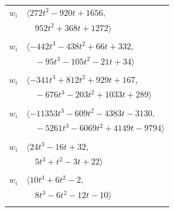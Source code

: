 \documentclass[11pt]{article}
\begin{document}
\begin{longtable}{@{}ll@{}}
$w_i$ & $\langle 272t^{2}-920t+1656,$\\
 & $\quad 952t^{2}+368t+1272\rangle$\\
\addlinespace[2pt]
\multicolumn{2}{@{}p{0.97\textwidth}@{}}{$i=16$, $D_i=16$, $\rho_{ij}$: $0{:}1, \allowbreak 14{:}2, \allowbreak 21{:}2, \allowbreak 34{:}2, \allowbreak 35{:}2, \allowbreak 42{:}2, \allowbreak 44{:}2, \allowbreak 50{:}1$}\\
$w_i$ & $\langle -442t^{3}-438t^{2}+66t+332,$\\
 & $\quad -95t^{3}-105t^{2}-21t+34\rangle$\\
\addlinespace[2pt]
\multicolumn{2}{@{}p{0.97\textwidth}@{}}{$i=17$, $D_i=16$, $\rho_{ij}$: $1{:}2, \allowbreak 3{:}1, \allowbreak 5{:}1, \allowbreak 8{:}2, \allowbreak 14{:}2, \allowbreak 15{:}1, \allowbreak 30{:}1, \allowbreak 33{:}2, \allowbreak 40{:}2, \allowbreak 41{:}2, \allowbreak 45{:}1, \allowbreak 56{:}2$}\\
$w_i$ & $\langle -341t^{3}+812t^{2}+929t+167,$\\
 & $\quad -676t^{3}-203t^{2}+1033t+289\rangle$\\
\addlinespace[2pt]
\multicolumn{2}{@{}p{0.97\textwidth}@{}}{$i=18$, $D_i=192$, $\rho_{ij}$: $2{:}2, \allowbreak 8{:}1, \allowbreak 23{:}1, \allowbreak 26{:}2, \allowbreak 33{:}2, \allowbreak 34{:}1, \allowbreak 35{:}2, \allowbreak 40{:}2, \allowbreak 44{:}1, \allowbreak 50{:}2, \allowbreak 54{:}2, \allowbreak 58{:}2, \allowbreak 61{:}1, \allowbreak 62{:}1$}\\
$w_i$ & $\langle -11353t^{3}-609t^{2}-4383t-3130,$\\
 & $\quad -5261t^{3}-6069t^{2}+4149t-9794\rangle$\\
\addlinespace[2pt]
\multicolumn{2}{@{}p{0.97\textwidth}@{}}{$i=19$, $D_i=2$, $\rho_{ij}$: $0{:}2, \allowbreak 4{:}1, \allowbreak 12{:}2, \allowbreak 15{:}1, \allowbreak 26{:}1, \allowbreak 33{:}1, \allowbreak 37{:}1, \allowbreak 38{:}1, \allowbreak 41{:}2$}\\
$w_i$ & $\langle 24t^{3}-16t+32,$\\
 & $\quad 5t^{3}+t^{2}-3t+22\rangle$\\
\addlinespace[2pt]
\multicolumn{2}{@{}p{0.97\textwidth}@{}}{$i=20$, $D_i=2$, $\rho_{ij}$: $9{:}1, \allowbreak 14{:}2, \allowbreak 23{:}1, \allowbreak 38{:}2, \allowbreak 48{:}1, \allowbreak 52{:}2$}\\
$w_i$ & $\langle 10t^{3}+6t^{2}-2,$\\
 & $\quad 8t^{3}-6t^{2}-12t-10\rangle$\\
\addlinespace[2pt]

\end{longtable}
\end{document}
